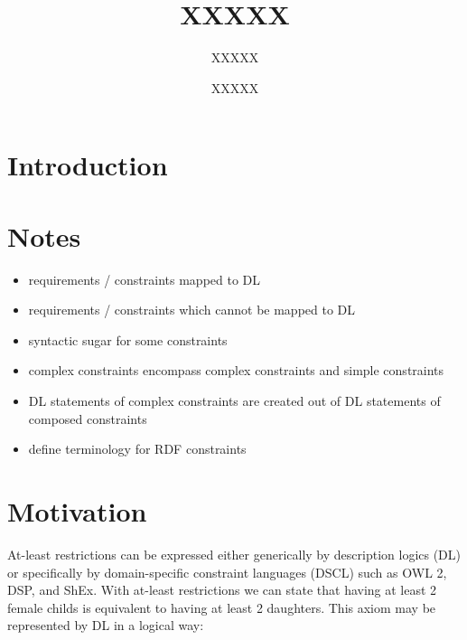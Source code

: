 \documentclass{llncs}
\begin{document}
%
%
\title{XXXXX}
%
%
\author{XXXXX \and XXXXX}
%
%

\maketitle              %

\begin{abstract}


\end{abstract}
%


\section{Introduction}

\section{Notes}

\begin{itemize}
	\item requirements / constraints mapped to DL
	\item requirements / constraints which cannot be mapped to DL
	\item syntactic sugar for some constraints
	\item complex constraints encompass complex constraints and simple constraints
	\item DL statements of complex constraints are created out of DL statements of composed constraints 
	\item define terminology for RDF constraints
\end{itemize}

\section{Motivation}

At-least restrictions can be expressed either generically by description logics (DL) or specifically by domain-specific constraint languages (DSCL) such as OWL 2, DSP, and ShEx.
With at-least restrictions we can state that having at least 2 female childs is equivalent to having at least 2 daughters. This axiom may be represented by DL in a logical way:
\end{document}
